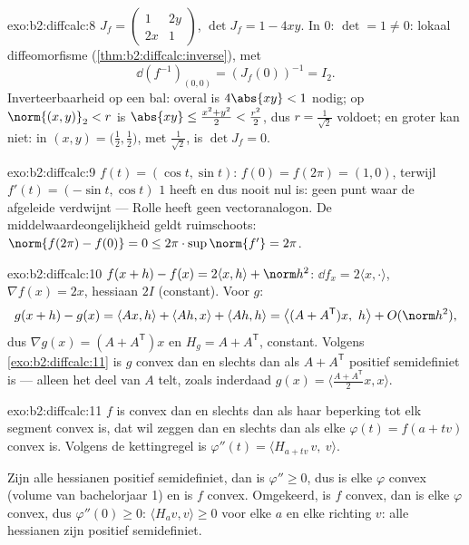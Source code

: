 \begin{solution}{exo:b2:diffcalc:8}
$J_f = \begin{pmatrix} 1 & 2y\\ 2x & 1\end{pmatrix}$, $\det J_f = 1
- 4xy$. In $0$: $\det = 1 \neq 0$: lokaal diffeomorfisme
(\cref{thm:b2:diffcalc:inverse}), met
\[
\dd(f^{-1})_{(0,0)} = (J_f(0))^{-1} = I_2 .
\]
Inverteerbaarheid op een bal: overal is $4\abs{xy} < 1$ nodig; op
$\norm{(x,y)}_2 < r$ is $\abs{xy} \leq \frac{x^2 + y^2}{2} <
\frac{r^2}{2}$, dus $r = \frac{1}{\sqrt2}$ voldoet; en groter kan
niet: in $(x, y) = \bigl(\tfrac12, \tfrac12\bigr)$, met 
$\frac{1}{\sqrt2}$, is $\det J_f = 0$.
\end{solution}

\begin{solution}{exo:b2:diffcalc:9}
$f(t) = (\cos t, \sin t)$: $f(0) = f(2\pi) = (1, 0)$, terwijl
$f'(t) = (-\sin t, \cos t)$  $1$ heeft en dus nooit nul is:
geen punt waar de afgeleide verdwijnt --- Rolle heeft geen
vectoranalogon. De middelwaardeongelijkheid geldt ruimschoots:
$\norm{f(2\pi) - f(0)} = 0 \leq 2\pi \cdot \sup\norm{f'} = 2\pi$.
\end{solution}

\begin{solution}{exo:b2:diffcalc:10}
$f(x+h) - f(x) = 2\langle x, h\rangle + \norm h^2$: $\dd f_x =
2\langle x, \cdot\rangle$, $\nabla f(x) = 2x$, hessiaan $2I$
(constant). Voor $g$:
\[
g(x + h) - g(x) = \langle Ax, h\rangle + \langle Ah, x\rangle
+ \langle Ah, h\rangle
= \bigl\langle (A + A^{\mathsf T})x,\ h\bigr\rangle +
O(\norm h^2),
\]
dus $\nabla g(x) = (A + A^{\mathsf T})x$ en $H_g = A + A^{\mathsf
T}$, constant. Volgens \cref{exo:b2:diffcalc:11} is $g$ convex dan
en slechts dan als $A + A^{\mathsf T}$ positief semidefiniet is ---
alleen het  deel van $A$ telt, zoals inderdaad $g(x) =
\langle \frac{A + A^{\mathsf T}}2 x, x\rangle$.
\end{solution}

\begin{solution}{exo:b2:diffcalc:11}
$f$ is convex dan en slechts dan als haar beperking tot elk segment
convex is, dat wil zeggen dan en slechts dan als elke $\varphi(t) =
f(a + tv)$ convex is. Volgens de kettingregel is $\varphi''(t) =
\langle H_{a+tv}\,v,\ v\rangle$.

Zijn alle hessianen positief semidefiniet, dan is $\varphi'' \geq
0$, dus is elke $\varphi$ convex (volume van bachelorjaar 1) en is
$f$ convex. Omgekeerd, is $f$ convex, dan is elke $\varphi$ convex,
dus $\varphi''(0) \geq 0$: $\langle H_a v, v\rangle \geq 0$ voor
elke $a$ en elke richting $v$: alle hessianen zijn positief
semidefiniet.
\end{solution}

